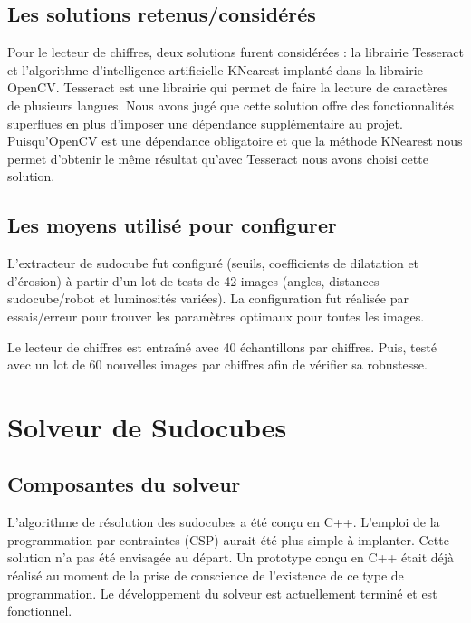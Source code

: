 \subsection{Les solutions retenus/considérés}
Pour le lecteur de chiffres, deux solutions furent considérées : la librairie Tesseract et l'algorithme d'intelligence artificielle KNearest implanté dans la librairie OpenCV. Tesseract est une librairie qui permet de faire la lecture de caractères de plusieurs langues. Nous avons jugé que cette solution offre des fonctionnalités superflues en plus d'imposer une dépendance supplémentaire au projet. Puisqu’OpenCV est une dépendance obligatoire et que la méthode KNearest nous permet d'obtenir le même résultat qu'avec Tesseract nous avons choisi cette solution.

\subsection{Les moyens utilisé pour configurer}
L'extracteur de sudocube fut configuré (seuils, coefficients de dilatation et d'érosion) à partir d'un lot de tests de 42 images (angles, distances sudocube/robot et luminosités variées). La configuration fut réalisée par essais/erreur pour trouver les paramètres optimaux pour toutes les images.

Le lecteur de chiffres est entraîné avec 40 échantillons par chiffres. Puis, testé avec un lot de 60 nouvelles images par chiffres afin de vérifier sa robustesse.

\section{Solveur de Sudocubes}

\subsection{Composantes du solveur}
L'algorithme de résolution des sudocubes a été conçu en C++. L'emploi de la programmation par contraintes (CSP) aurait été  plus simple à implanter. Cette solution n'a pas été envisagée au départ. Un prototype conçu en C++ était déjà réalisé au moment de la prise de conscience de l'existence de ce type de programmation. Le développement du solveur est actuellement terminé et est fonctionnel.


